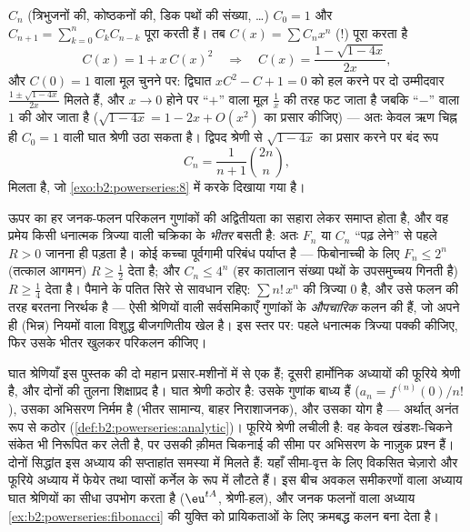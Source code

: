 \begin{example}[कातालान संख्याएँ]\label{ex:b2:powerseries:catalan}
 $C_n$ (त्रिभुजनों की, कोष्ठकनों की, डिक पथों की संख्या,
\dots) $C_0 = 1$ और $C_{n+1} = \sum_{k=0}^n
C_kC_{n-k}$ पूरा करती हैं। तब  $C(x) = \sum C_nx^n$ (!) पूरा करता
है
\[
C(x) = 1 + x\,C(x)^2
\quad\Longrightarrow\quad
C(x) = \frac{1 - \sqrt{1 - 4x}}{2x} ,
\]
और $C(0) = 1$ वाला मूल चुनने पर: द्विघात $xC^2 - C + 1 = 0$ को हल करने पर दो उम्मीदवार $\frac{1 \pm
\sqrt{1-4x}}{2x}$
मिलते हैं, और $x \to 0$ होने पर ``$+$'' वाला मूल $\frac1x$ की तरह फट जाता है जबकि
``$-$'' वाला $1$ की ओर जाता है ($\sqrt{1-4x} = 1 - 2x + O(x^2)$ का प्रसार कीजिए) --- अतः केवल ऋण
चिह्न ही $C_0 = 1$ वाली घात श्रेणी उठा सकता है। द्विपद श्रेणी से $\sqrt{1 - 4x}$ का प्रसार
करने पर बंद रूप
\[
C_n = \frac{1}{n+1}\binom{2n}{n} ,
\]
मिलता है, जो \cref{exo:b2:powerseries:8} में करके दिखाया गया है।
\end{example}

\begin{remark}[औपचारिक श्रेणी बनाम अभिसारी श्रेणी]
ऊपर का हर जनक-फलन परिकलन गुणांकों की अद्वितीयता का सहारा लेकर समाप्त होता
है, और वह प्रमेय किसी धनात्मक त्रिज्या वाली चक्रिका के \emph{भीतर} बसती
है: अतः $F_n$ या $C_n$ ``पढ़ लेने'' से पहले $R > 0$ जानना ही पड़ता है। कोई कच्चा
पूर्वगामी परिबंध पर्याप्त है --- फिबोनाच्ची के लिए $F_n \leq 2^n$ (तत्काल आगमन) $R \geq
\frac12$
देता है; और $C_n \leq 4^n$ (हर कातालान संख्या पथों के उपसमुच्चय गिनती है) $R \geq \frac14$ देता
है। पैमाने के पतित सिरे से सावधान रहिए: $\sum n!\,x^n$ की त्रिज्या $0$ है, और उसे
फलन की तरह बरतना निरर्थक है --- ऐसी श्रेणियों वाली सर्वसमिकाएँ गुणांकों
के \emph{औपचारिक} कलन की हैं, जो अपने ही (भिन्न) नियमों वाला विशुद्ध
बीजगणितीय खेल है। इस स्तर पर: पहले धनात्मक त्रिज्या पक्की कीजिए, फिर उसके
भीतर खुलकर परिकलन कीजिए।
\end{remark}

\begin{remark}[इसी खंड के भीतर के परिप्रेक्ष्य]
घात श्रेणियाँ इस पुस्तक की दो महान प्रसार-मशीनों में से एक हैं; दूसरी
हार्मोनिक अध्यायों की फूरिये श्रेणी है, और दोनों की तुलना शिक्षाप्रद है।
घात श्रेणी कठोर है: उसके गुणांक बाध्य हैं ($a_n = f^{(n)}(0)/n!$), उसका अभिसरण निर्मम है
(भीतर सामान्य, बाहर निराशाजनक), और उसका योग  है --- अर्थात् अनंत
रूप से कठोर (\cref{def:b2:powerseries:analytic})। फूरिये श्रेणी लचीली है: वह केवल खंडशः-चिकने संकेत भी
निरूपित कर लेती है, पर उसकी क़ीमत चिकनाई की सीमा पर अभिसरण के नाज़ुक
प्रश्न हैं। दोनों सिद्धांत इस अध्याय की सप्ताहांत समस्या में मिलते हैं:
यहाँ सीमा-वृत्त के लिए विकसित चेज़ारो और  फूरिये अध्याय में फेयेर
तथा प्वासों कर्नेल के रूप में लौटते हैं। इस बीच अवकल समीकरणों वाला अध्याय
घात श्रेणियों का सीधा उपभोग करता है ($\eu^{tA}$, श्रेणी-हल), और जनक फलनों वाला
अध्याय \cref{ex:b2:powerseries:fibonacci} की युक्ति को प्रायिकताओं के लिए क्रमबद्ध कलन बना देता है।
\end{remark}

